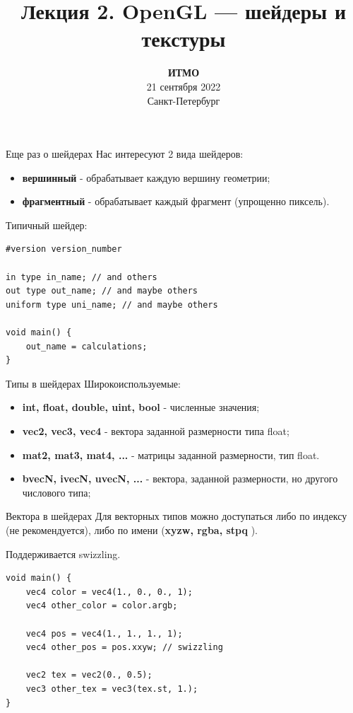 \documentclass[aspectration=1610,t]{beamer}
\title{Лекция 2. OpenGL --- шейдеры и текстуры}
\date{
   \textbf{ИТМО}\\
   21 сентября 2022\\
   Санкт-Петербург
}
\begin{document}
\begin{frame}
  \titlepage
\end{frame}

\begin{frame}[fragile]{Еще раз о шейдерах}
    Нас интересуют 2 вида шейдеров:
    \begin{itemize}
        \item {\bf вершинный} - обрабатывает каждую вершину геометрии;
        \item {\bf фрагментный} - обрабатывает каждый фрагмент (упрощенно пиксель).
    \end{itemize}

    Типичный шейдер:
            {\small \begin{lstlisting}
#version version_number

in type in_name; // and others
out type out_name; // and maybe others
uniform type uni_name; // and maybe others

void main() {
    out_name = calculations;
}
            \end{lstlisting}}
\end{frame}

\begin{frame}[fragile]{Типы в шейдерах}
    Широкоиспользуемые:
    \begin{itemize}
        \item {\bf int, float, double, uint, bool} - численные значения;
        \item {\bf vec2, vec3, vec4 } - вектора заданной размерности типа float;
        \item {\bf mat2, mat3, mat4, ...} - матрицы заданной размерности, тип float.
        \item {\bf bvecN, ivecN, uvecN, ... } - вектора, заданной размерности, но другого числового типа;
    \end{itemize}
\end{frame}

\begin{frame}[fragile]{Вектора в шейдерах}
    Для векторных типов можно доступаться либо по индексу (не рекомендуется), либо по имени ({\bf xyzw, rgba, stpq }).
    
    Поддерживается swizzling.
            {\small \begin{lstlisting}
void main() {
    vec4 color = vec4(1., 0., 0., 1);
    vec4 other_color = color.argb;

    vec4 pos = vec4(1., 1., 1., 1);
    vec4 other_pos = pos.xxyw; // swizzling

    vec2 tex = vec2(0., 0.5);
    vec3 other_tex = vec3(tex.st, 1.);
}
            \end{lstlisting}}
\end{frame}
\end{document}
